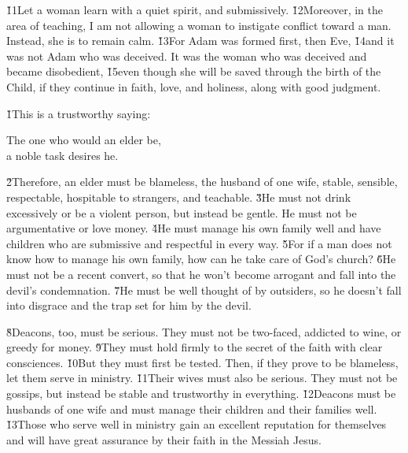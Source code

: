 \v{11}Let a woman learn with a quiet spirit, and submissively. \v{12}Moreover, in the area of teaching, I am not allowing a woman to instigate conflict toward a man. Instead, she is to remain calm. \v{13}For Adam was formed first, then Eve, \v{14}and it was not Adam who was deceived. It was the woman who was deceived and became disobedient, \v{15}even though she will be saved through the birth of the Child, if they continue in faith, love, and holiness, along with good judgment.

\v{1}This is a trustworthy saying:

\begin{poetry}
\poeml The one who would an elder be, \\
\poeml a noble task desires he.
\end{poetry}

\v{2}Therefore, an elder must be blameless, the husband of one wife, stable, sensible, respectable, hospitable to strangers, and teachable. \v{3}He must not drink excessively or be a violent person, but instead be gentle. He must not be argumentative or love money. \v{4}He must manage his own family well and have children who are submissive and respectful in every way. \v{5}For if a man does not know how to manage his own family, how can he take care of God's church? \v{6}He must not be a recent convert, so that he won't become arrogant and fall into the devil's condemnation. \v{7}He must be well thought of by outsiders, so he doesn't fall into disgrace and the trap set for him by the devil.

\v{8}Deacons, too, must be serious. They must not be two-faced, addicted to wine, or greedy for money. \v{9}They must hold firmly to the secret of the faith with clear consciences. \v{10}But they must first be tested. Then, if they prove to be blameless, let them serve in ministry. \v{11}Their wives must also be serious. They must not be gossips, but instead be stable and trustworthy in everything. \v{12}Deacons must be husbands of one wife and must manage their children and their families well. \v{13}Those who serve well in ministry gain an excellent reputation for themselves and will have great assurance by their faith in the Messiah Jesus.

